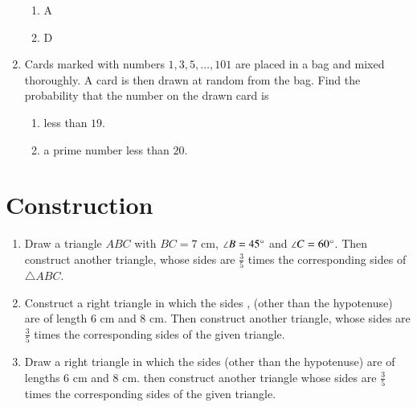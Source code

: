 \documentclass[journal,12pt,onecolumn]{IEEEtran}
\theoremstyle{remark}
\begin{document}
\begin{enumerate}
\begin{figure}[ht]
\begin{tikzpicture}[scale = 5]
\end{tikzpicture}
\end{figure}
\begin{enumerate}[label=\Roman*.]
\item A\\
\item D\\
\end{enumerate}
\item Cards marked with numbers $1,3,5, \ldots, 101$ are placed in a bag and mixed thoroughly. A card is then drawn at random from the bag. Find the probability that the number on the drawn card is 
\begin{enumerate}[label=\Roman*.]
\item less than $19$.
\item a prime number less than $20$.\\
\end{enumerate}
\end{enumerate}
\section{Construction}
\begin{enumerate}
\item Draw a triangle $ABC$ with $BC = 7 \text{ cm}$, $\angle B = 45 \degree$ and $\angle C = 60 \degree$. Then construct another triangle, whose sides are $\frac{3}{5}$ times the corresponding sides of $\triangle ABC$.\\
\item Construct a right triangle in which the sides , (other than the hypotenuse) are of length $6\text{ cm}$ and $8\text{ cm}$. Then construct another triangle, whose sides are $\frac{3}{5}$ times the corresponding sides of the given triangle.\\
\item Draw a right triangle in which the sides (other than the hypotenuse) are of lengths $6\text{ cm}$ and $8\text{ cm}$. then construct another triangle whose sides are $\frac{3}{5}$ times the corresponding sides of the given triangle.\\
\end{enumerate}
\end{document}
